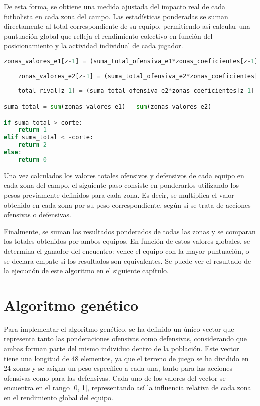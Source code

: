 De esta forma, se obtiene una medida ajustada del impacto real de cada futbolista en cada zona del campo. Las estadísticas ponderadas se suman directamente al total correspondiente de su equipo, permitiendo así calcular una puntuación global que refleja el rendimiento colectivo en función del posicionamiento y la actividad individual de cada jugador.

\begin{lstlisting}[language=Python, caption={Procesamiento de cada zona}, label={lst:codigo-python}]
    zonas_valores_e1[z-1] = (suma_total_ofensiva_e1*zonas_coeficientes[z-1] - suma_total_defensiva_e2*zonas_coeficientes[z-1+24])
    
    zonas_valores_e2[z-1] = (suma_total_ofensiva_e2*zonas_coeficientes[z-1] - suma_total_defensiva_e1*zonas_coeficientes[z-1+24])
    
    total_rival[z-1] = (suma_total_ofensiva_e2*zonas_coeficientes[z-1] + suma_total_defensiva_e1*zonas_coeficientes[z-1+24])

suma_total = sum(zonas_valores_e1) - sum(zonas_valores_e2)

if suma_total > corte:
    return 1
elif suma_total < -corte:
    return 2
else:
    return 0

\end{lstlisting}

Una vez calculados los valores totales ofensivos y defensivos de cada equipo en cada zona del campo, el siguiente paso consiste en ponderarlos utilizando los pesos previamente definidos para cada zona. Es decir, se multiplica el valor obtenido en cada zona por su peso correspondiente, según si se trata de acciones ofensivas o defensivas.

Finalmente, se suman los resultados ponderados de todas las zonas y se comparan los totales obtenidos por ambos equipos. En función de estos valores globales, se determina el ganador del encuentro: vence el equipo con la mayor puntuación, o se declara empate si los resultados son equivalentes. Se puede ver el resultado de la ejecución de este algoritmo en el siguiente capítulo.

\section{Algoritmo genético}

Para implementar el algoritmo genético, se ha definido un único vector que representa tanto las ponderaciones ofensivas como defensivas, considerando que ambas forman parte del mismo individuo dentro de la población. Este vector tiene una longitud de 48 elementos, ya que el terreno de juego se ha dividido en 24 zonas y se asigna un peso específico a cada una, tanto para las acciones ofensivas como para las defensivas. Cada uno de los valores del vector se encuentra en el rango [0, 1], representando así la influencia relativa de cada zona en el rendimiento global del equipo.

